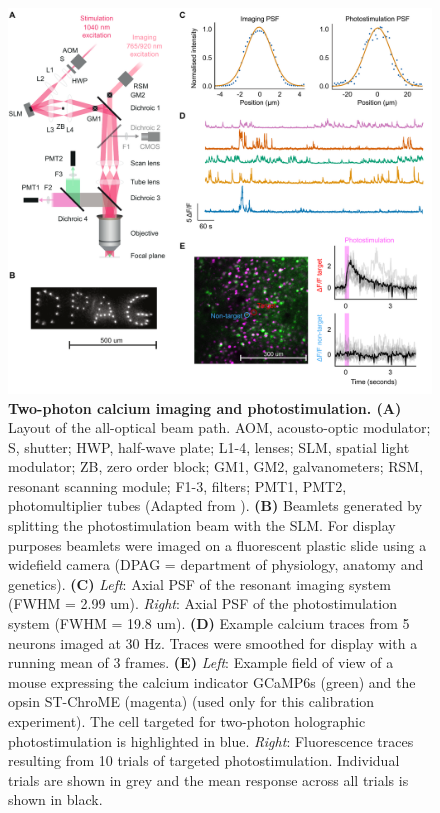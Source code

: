 \begin{figure}[!h]
\includegraphics[scale=0.567]{figures/2p_imaging+photostim.pdf}
\caption[\textbf{Two-photon calcium imaging and photostimulation}]{
\textbf{Two-photon calcium imaging and photostimulation. (A)} Layout of the all-optical beam path. AOM, acousto-optic modulator; S, shutter; HWP, half-wave plate; L1-4, lenses; SLM, spatial light modulator; ZB, zero order block; GM1, GM2, galvanometers; RSM, resonant scanning module; F1-3, filters; PMT1, PMT2, photomultiplier tubes (Adapted from \cite{packer_simultaneous_2015}). \textbf{(B)} Beamlets generated by splitting the photostimulation beam with the SLM. For display purposes beamlets were imaged on a fluorescent plastic slide using a widefield camera (DPAG = department of physiology, anatomy and genetics). \textbf{(C)} \textit{Left}: Axial PSF of the resonant imaging system (FWHM = 2.99 um). \textit{Right}: Axial PSF of the photostimulation system (FWHM
= 19.8 um). \textbf{(D)} Example calcium traces from 5 neurons imaged at 30 Hz. Traces were smoothed for display with a running mean of 3 frames. \textbf{(E)} \textit{Left}: Example field of view of a mouse expressing the calcium indicator GCaMP6s (green) and the opsin ST-ChroME (magenta) (used only for this calibration experiment). The cell targeted for two-photon holographic photostimulation is highlighted in blue. \textit{Right}: Fluorescence traces resulting from 10 trials of targeted photostimulation. Individual trials are shown in grey and the mean response across all trials is shown in black. 
} 
\label{fig:all-optical}
\end{figure}

